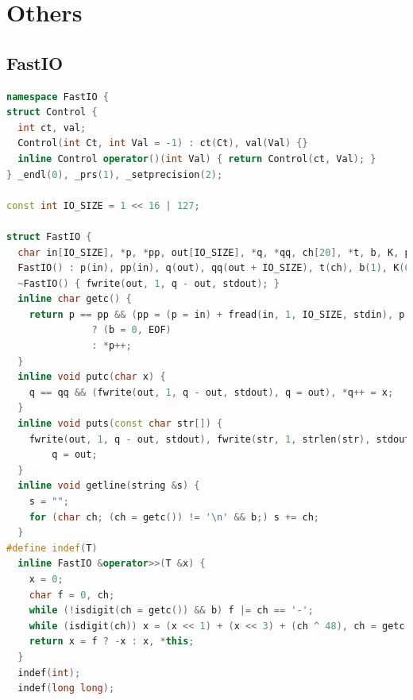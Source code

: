 \documentclass[twoside]{article}
\begin{document}
\section{Others}

\subsection{FastIO}
\begin{lstlisting}[language=c++]
namespace FastIO {
struct Control {
  int ct, val;
  Control(int Ct, int Val = -1) : ct(Ct), val(Val) {}
  inline Control operator()(int Val) { return Control(ct, Val); }
} _endl(0), _prs(1), _setprecision(2);

const int IO_SIZE = 1 << 16 | 127;

struct FastIO {
  char in[IO_SIZE], *p, *pp, out[IO_SIZE], *q, *qq, ch[20], *t, b, K, prs;
  FastIO() : p(in), pp(in), q(out), qq(out + IO_SIZE), t(ch), b(1), K(6) {}
  ~FastIO() { fwrite(out, 1, q - out, stdout); }
  inline char getc() {
    return p == pp && (pp = (p = in) + fread(in, 1, IO_SIZE, stdin), p == pp)
               ? (b = 0, EOF)
               : *p++;
  }
  inline void putc(char x) {
    q == qq && (fwrite(out, 1, q - out, stdout), q = out), *q++ = x;
  }
  inline void puts(const char str[]) {
    fwrite(out, 1, q - out, stdout), fwrite(str, 1, strlen(str), stdout),
        q = out;
  }
  inline void getline(string &s) {
    s = "";
    for (char ch; (ch = getc()) != '\n' && b;) s += ch;
  }
#define indef(T)                                                               \
  inline FastIO &operator>>(T &x) {                                            \
    x = 0;                                                                     \
    char f = 0, ch;                                                            \
    while (!isdigit(ch = getc()) && b) f |= ch == '-';                         \
    while (isdigit(ch)) x = (x << 1) + (x << 3) + (ch ^ 48), ch = getc();      \
    return x = f ? -x : x, *this;                                              \
  }
  indef(int);
  indef(long long);


\end{lstlisting}
\end{document}
